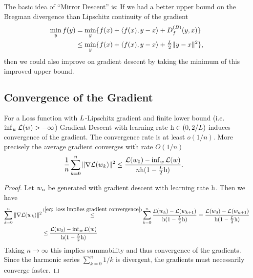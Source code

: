 \begin{remark}\label{rem: mirror descent}
	The basic idea of ``Mirror Descent''
	\parencite[e.g.][]{guptaAdvancedAlgorithmsFall2020,chenLargeScaleOptimizationData2019,bubeckConvexOptimizationAlgorithms2015}
	is: If we had a better upper bound on the Bregman divergence than Lipschitz
	continuity of the gradient 
	\begin{align*}
		\min_y f(y)
		&= \min_y \{f(x) + \langle f(x), y-x\rangle +D^{(B)}_{f}(y,x)\} \\
		&\le \min_y\{f(x) + \langle f(x), y-x\rangle +\tfrac{L}{2} \|y-x\|^2\},
	\end{align*}
	then we could also improve on gradient descent by taking the minimum of this
	improved upper bound.
\end{remark}

\subsection{Convergence of the Gradient}

\begin{theorem}\label{thm: convergence of the gradient (only lip cont)}
	For a Loss function with \(L\)-Lipschitz gradient and finite lower bound
	(i.e. \(\inf_{w}\mathcal{L}(w) >-\infty\)) Gradient Descent with
	learning rate \(\text{h}\in(0,2/L)\) induces convergence of the gradient.
	The convergence rate is at least \(o(1/n)\). More precisely the average
	gradient converges with rate \(O(1/n)\)
	\begin{align*}
		\frac1{n}\sum_{k=0}^n \|\nabla\mathcal{L}(w_k)\|^2
		&\le \frac{\mathcal{L}(w_0) - \inf_{w}\mathcal{L}(w)}{n\text{h}(1-\tfrac{L}2\text{h})}.
	\end{align*} 
\end{theorem}
\begin{proof}
	Let \(w_n\) be generated with gradient descent with learning rate \(\text{h}\).
	Then we have	
	\begin{align*}
		\sum_{k=0}^n \|\nabla\Loss(\weights_k)\|^2
		&\xle{(\ref{eq: loss implies gradient convergence})}
		\sum_{k=0}^n \frac{\Loss(\weights_k) - \Loss(\weights_{k+1})}{\lr(1-\tfrac{\ubound}2\lr)}
		= \frac{\Loss(\weights_0) - \Loss(\weights_{n+1})}{\lr(1-\tfrac{\ubound}2\lr)}
		\\
		&\le \frac{\Loss(\weights_0) - \inf_{\weights}\Loss(\weights)}{\lr(1-\tfrac{\ubound}2\lr)}
	\end{align*}
	Taking \(n\to\infty\) this implies summability and thus convergence of the
	gradients. Since the harmonic series \(\sum_{k=0}^n 1/k\) is divergent,
	the gradients must necessarily converge faster.
\end{proof}

